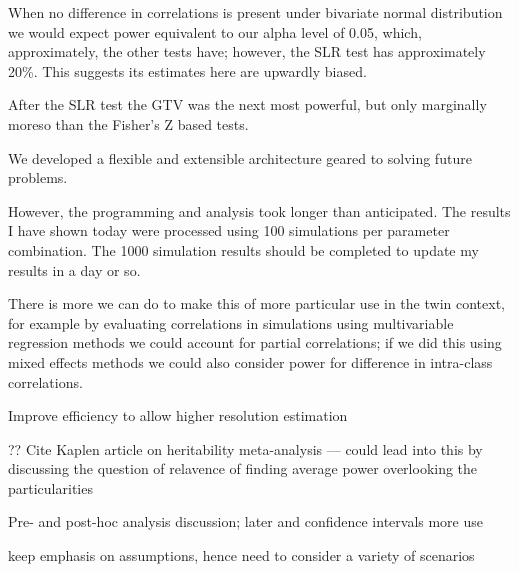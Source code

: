 When no difference in correlations is present under bivariate normal distribution we would expect power equivalent to our alpha level of 0.05, which, approximately, the other tests have; however, the SLR test has approximately 20\%.  This suggests its estimates here are upwardly biased.

After the SLR test the GTV was the next most powerful, but only marginally moreso than the Fisher's Z based tests.



We developed a flexible and extensible architecture geared to solving future problems.


However, the programming and analysis took longer than anticipated.  The results I have shown today were processed using 100 simulations per parameter combination.  The 1000 simulation results should be completed to update my results in a day or so.

There is more we can do to make this of more particular use in the twin context, for example by evaluating correlations in simulations using multivariable regression methods we could account for partial correlations; if we did this using mixed effects methods we could also consider power for difference in intra-class correlations.

Improve efficiency to allow higher resolution estimation


??
Cite Kaplen article on heritability meta-analysis --- could lead into this by discussing the question of relavence of finding average power overlooking the particularities

Pre- and post-hoc analysis discussion; later and confidence intervals more use

keep emphasis on assumptions, hence need to consider a variety of scenarios